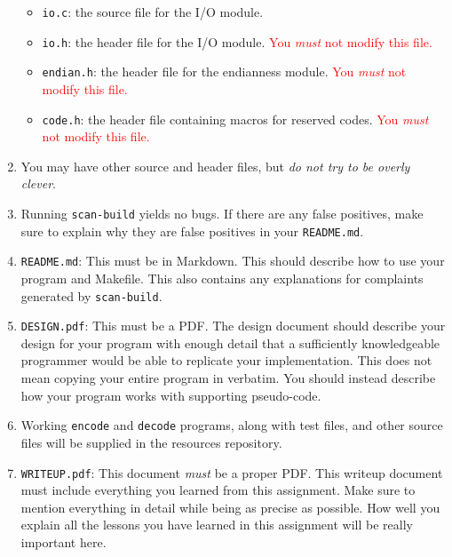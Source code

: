 \documentclass{article}
\begin{document}
\begin{enumerate}
\begin{itemize}
            \item \texttt{io.c}: the source file for the I/O module.

            \item \texttt{io.h}: the header file for the I/O module.
                \textcolor{red}{You \emph{must} not modify this file.}

            \item \texttt{endian.h}: the header file for the endianness module.
                \textcolor{red}{You \emph{must} not modify this file.}

            \item \texttt{code.h}: the header file containing macros for
              reserved codes. \textcolor{red}{You \emph{must} not modify
              this file.}
        \end{itemize}

    \item You may have other source and header files, but
        \emph{do not try to be overly clever}.

    \item Running \texttt{scan-build} yields no bugs. If there are any
      false positives, make sure to explain why they are false positives
      in your \texttt{README.md}.

    \item \texttt{README.md}: This must be in Markdown. This should
      describe how to use your program and Makefile. This also contains
      any explanations for complaints generated by \texttt{scan-build}.

    \item \texttt{DESIGN.pdf}: This must be a PDF. The design document should
        describe your design for your program with enough detail that a
        sufficiently knowledgeable programmer would be able to replicate your
        implementation. This does not mean copying your entire program in
        verbatim. You should instead describe how your program works with
        supporting pseudo-code.

    \item Working \texttt{encode} and \texttt{decode} programs, along with test
        files, and other source files will be supplied in the resources repository.
    \item \texttt{WRITEUP.pdf}:  This document \emph{must} be a proper PDF\@.
        This writeup document must include everything you learned from this
        assignment. Make sure to mention everything in detail while being as
        precise as possible. How well you explain all the lessons you have
        learned in this assignment will be really important here.

\end{enumerate}
\end{document}
